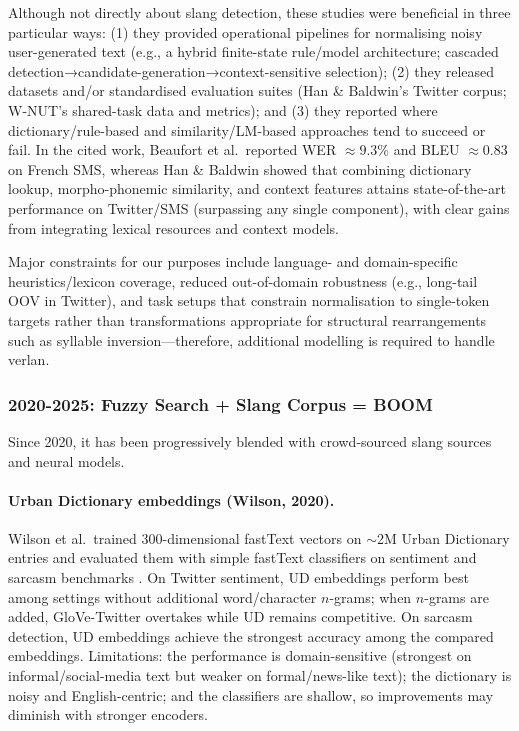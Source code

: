 \documentclass[12pt]{article}
\begin{document}
Although not directly about slang detection, these studies were beneficial in three particular ways: (1) they provided operational pipelines for normalising noisy user-generated text (e.g., a hybrid finite-state rule/model architecture; cascaded detection→candidate-generation→context-sensitive selection); (2) they released datasets and/or standardised evaluation suites (Han \& Baldwin's Twitter corpus; W-NUT's shared-task data and metrics); and (3) they reported where dictionary/rule-based and similarity/LM-based approaches tend to succeed or fail. In the cited work, Beaufort et al.\ reported WER $\approx 9.3\%$ and BLEU $\approx 0.83$ on French SMS, whereas Han \& Baldwin showed that combining dictionary lookup, morpho-phonemic similarity, and context features attains state-of-the-art performance on Twitter/SMS (surpassing any single component), with clear gains from integrating lexical resources and context models.

Major constraints for our purposes include language- and domain-specific heuristics/lexicon coverage, reduced out-of-domain robustness (e.g., long-tail OOV in Twitter), and task setups that constrain normalisation to single-token targets rather than transformations appropriate for structural rearrangements such as syllable inversion---therefore, additional modelling is required to handle verlan.


\subsubsection{2020-2025: Fuzzy Search + Slang Corpus = BOOM}

Since 2020, it has been progressively blended with crowd-sourced slang sources and neural models.

\paragraph{Urban Dictionary embeddings (Wilson, 2020).}
Wilson et al.\ trained $300$-dimensional fastText vectors on $\sim$2M Urban Dictionary entries and evaluated them with simple fastText classifiers on sentiment and sarcasm benchmarks \cite{urban2020embeddings}. On Twitter sentiment, UD embeddings perform best among settings without additional word/character $n$-grams; when $n$-grams are added, GloVe-Twitter overtakes while UD remains competitive. On sarcasm detection, UD embeddings achieve the strongest accuracy among the compared embeddings. Limitations: the performance is domain-sensitive (strongest on informal/social-media text but weaker on formal/news-like text); the dictionary is noisy and English-centric; and the classifiers are shallow, so improvements may diminish with stronger encoders. \cite{urban2020embeddings}
\end{document}
